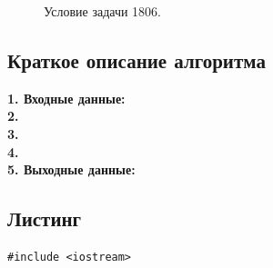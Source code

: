 \documentclass[a5paper, 10pt]{article}
\theoremstyle{definition}
\theoremstyle{plain}
\theoremstyle{remark}
\begin{document}
\begin{figure}[h!]
\caption{Условие задачи 1806.}
\end{figure}

\subsection{Краткое описание алгоритма}
\textbf{1. Входные данные:} \\
\textbf{2.}  \\
\textbf{3.}  \\
\textbf{4.}  \\
\textbf{5. Выходные данные:}

\subsection{Листинг}

\begin{center}
\begin{lstlisting}[label=some-code,caption={Исходный код для 1806}]
#include <iostream>


\end{lstlisting}
\end{center}
\end{document}
